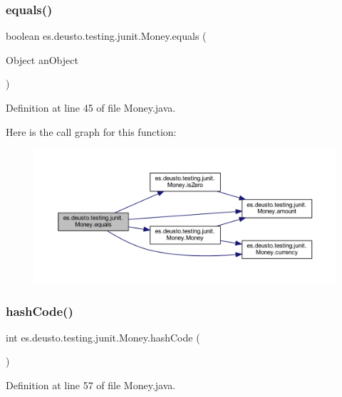 \subsubsection{\texorpdfstring{equals()}{equals()}}
{\footnotesize\ttfamily boolean es.\+deusto.\+testing.\+junit.\+Money.\+equals (\begin{DoxyParamCaption}\item[{Object}]{an\+Object }\end{DoxyParamCaption})}



Definition at line 45 of file Money.\+java.

Here is the call graph for this function\+:\nopagebreak
\begin{figure}[H]
\begin{center}
\leavevmode
\includegraphics[width=350pt]{classes_1_1deusto_1_1testing_1_1junit_1_1_money_a2356df38b8e9ecdd969bab11d6dd301b_cgraph}
\end{center}
\end{figure}
\mbox{\label{classes_1_1deusto_1_1testing_1_1junit_1_1_money_af6cfb5b27bf97170d990dea12de04f37}} 
\subsubsection{\texorpdfstring{hash\+Code()}{hashCode()}}
{\footnotesize\ttfamily int es.\+deusto.\+testing.\+junit.\+Money.\+hash\+Code (\begin{DoxyParamCaption}{ }\end{DoxyParamCaption})}



Definition at line 57 of file Money.\+java.

